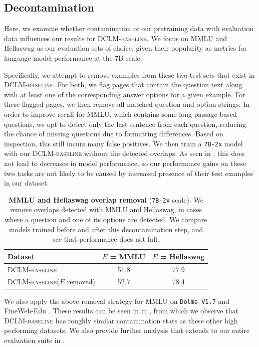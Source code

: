 \documentclass{article}
\newcommand{\hqpool}{\textsc{DCLM-baseline}\xspace}
\newcommand{\xltrack}{\texttt{7B-2x}\xspace}
\newcommand{\dolmalatest}{\texttt{Dolma-V1.7}\xspace}
\begin{document}
\subsection{Decontamination}
\label{sec:decontamination}
\vspace{-2mm}

Here, we examine whether contamination of our pretraining data with evaluation data influences our results for \hqpool.
We focus on MMLU and Hellaswag as our evaluation sets of choice, given their popularity as metrics for language model performance at the 7B scale.

Specifically, we attempt to remove examples from these two test sets that exist in \hqpool.
For both, we flag pages that contain the question text along with at least one of the corresponding answer options for a given example. For these flagged pages, we then remove all matched question and option strings.
In order to improve recall for MMLU, which contains some long passage-based questions, we opt to detect only the last sentence from each question, reducing the chance of missing questions due to formatting differences. Based on inspection, this still incurs many false positives.
We then train a \xltrack model with our \hqpool without the detected overlaps. As seen in , this does not lead to decreases in model performance, so our performance gains on these two tasks are not likely to be caused by increased presence of their test examples in our dataset.

\begin{table}[h]
\centering
\caption{\textbf{MMLU and Hellaswag overlap removal} (\xltrack scale). We remove overlaps detected with MMLU and Hellaswag, in cases where a question and one of its options are detected. We compare models trained before and after this decontamination step, and see that performance does not fall.}
\label{tab:decontamination-appx-excision-results}
\begin{tabular}{@{}lcc}
\toprule
Dataset                     & $E$ = MMLU & $E$ = Hellaswag\\ \midrule
\hqpool      &  51.8    &    77.9   \\
\hqpool ($E$ removed) & 52.7    &    78.4   \\ \bottomrule
\end{tabular}
\end{table}

We also apply the above removal strategy for MMLU on \dolmalatest \citep{soldaini2024dolma} and FineWeb-Edu \citep{lozhkov2024fineweb-edu}.
These results can be seen in  in , from which we observe that
\hqpool has roughly similar contamination stats as these other high performing datasets.
We also provide further analysis that extends to our entire evaluation suite in .
\end{document}
